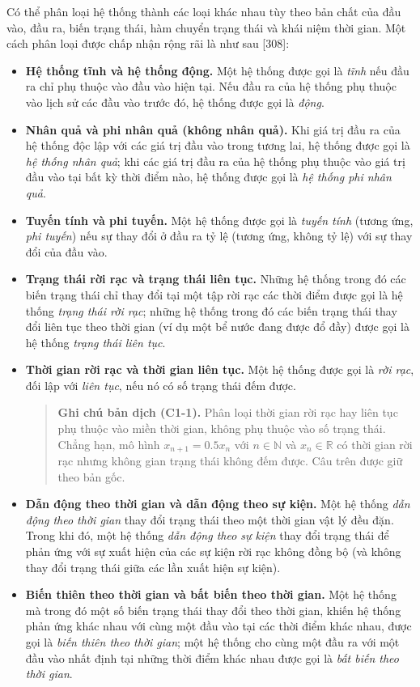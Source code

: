 Có thể phân loại hệ thống thành các loại khác nhau tùy theo bản chất của đầu vào, đầu ra, biến trạng thái, hàm chuyển trạng thái và khái niệm thời gian. Một cách phân loại được chấp nhận rộng rãi là như sau [308]:
\begin{itemize}
\item \textbf{Hệ thống tĩnh và hệ thống động.} Một hệ thống được gọi là \emph{tĩnh} nếu đầu ra chỉ phụ thuộc vào đầu vào hiện tại. Nếu đầu ra của hệ thống phụ thuộc vào lịch sử các đầu vào trước đó, hệ thống được gọi là \emph{động}.
\item \textbf{Nhân quả và phi nhân quả (không nhân quả).} Khi giá trị đầu ra của hệ thống độc lập với các giá trị đầu vào trong tương lai, hệ thống được gọi là \emph{hệ thống nhân quả}; khi các giá trị đầu ra của hệ thống phụ thuộc vào giá trị đầu vào tại bất kỳ thời điểm nào, hệ thống được gọi là \emph{hệ thống phi nhân quả}.
\item \textbf{Tuyến tính và phi tuyến.} Một hệ thống được gọi là \emph{tuyến tính} (tương ứng, \emph{phi tuyến}) nếu sự thay đổi ở đầu ra tỷ lệ (tương ứng, không tỷ lệ) với sự thay đổi của đầu vào.
\item \textbf{Trạng thái rời rạc và trạng thái liên tục.} Những hệ thống trong đó các biến trạng thái chỉ thay đổi tại một tập rời rạc các thời điểm được gọi là hệ thống \emph{trạng thái rời rạc}; những hệ thống trong đó các biến trạng thái thay đổi liên tục theo thời gian (ví dụ một bể nước đang được đổ đầy) được gọi là hệ thống \emph{trạng thái liên tục}.
\item \textbf{Thời gian rời rạc và thời gian liên tục.} Một hệ thống được gọi là \emph{rời rạc}, đối lập với \emph{liên tục}, nếu nó có số trạng thái đếm được.
\begin{quote}\small
\textbf{Ghi chú bản dịch (C1-1).} Phân loại thời gian rời rạc hay liên tục phụ thuộc vào miền thời gian, không phụ thuộc vào số trạng thái. Chẳng hạn, mô hình $x_{n+1}=0.5x_n$ với $n\in\mathbb{N}$ và $x_n\in\mathbb{R}$ có thời gian rời rạc nhưng không gian trạng thái không đếm được. Câu trên được giữ theo bản gốc.
\end{quote}
\item \textbf{Dẫn động theo thời gian và dẫn động theo sự kiện.} Một hệ thống \emph{dẫn động theo thời gian} thay đổi trạng thái theo một thời gian vật lý đều đặn. Trong khi đó, một hệ thống \emph{dẫn động theo sự kiện} thay đổi trạng thái để phản ứng với sự xuất hiện của các sự kiện rời rạc không đồng bộ (và không thay đổi trạng thái giữa các lần xuất hiện sự kiện).
\item \textbf{Biến thiên theo thời gian và bất biến theo thời gian.} Một hệ thống mà trong đó một số biến trạng thái thay đổi theo thời gian, khiến hệ thống phản ứng khác nhau với cùng một đầu vào tại các thời điểm khác nhau, được gọi là \emph{biến thiên theo thời gian}; một hệ thống cho cùng một đầu ra với một đầu vào nhất định tại những thời điểm khác nhau được gọi là \emph{bất biến theo thời gian}.
\end{itemize}

